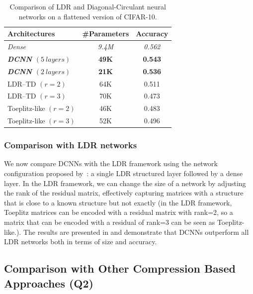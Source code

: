 \begin{table}[htb]
  \centering
  \begin{tabular}{lcc}
    \toprule
    \textbf{Architectures} & \textbf{\#Parameters} & \textbf{Accuracy}  \\
    \midrule
    \textit{Dense} & \textit{9.4M}	 & \textit{0.562} \\
    \textbf{\textit{DCNN $(5\ layers)$}} & \textbf{49K}	& \textbf{0.543} \\
    \textbf{\textit{DCNN $(2\ layers)$}} & \textbf{21K} & \textbf{0.536} \\
    LDR--TD	$(r = 2)$	         & 64K	& 0.511 \\
    LDR--TD	$(r = 3)$	         & 70K	& 0.473 \\
    Toeplitz-like $(r=2)$	         & 46K	& 0.483 \\
    Toeplitz-like $(r =3)$	         & 52K  & 0.496 \\
    \bottomrule
    \end{tabular}
    \caption{Comparison of LDR and Diagonal-Circulant neural networks on a flattened version of CIFAR-10.} 
    \label{table:ch4-xp_ldr}
\end{table}

\subsubsection{Comparison with LDR networks}


We now compare DCNNs with the LDR framework using the network configuration proposed by~\citet{thomas2018learning}: a single LDR structured layer followed by a dense layer.
In the LDR framework, we can change the size of a network by adjusting the rank of the residual matrix, effectively capturing matrices with a structure that is close to a known structure but not exactly (in the LDR framework, Toeplitz matrices can be encoded with a residual matrix with rank=2, so a matrix that can be encoded with a residual of rank=3 can be seen as Toeplitz-like.).
The results are presented in  and demonstrate that DCNNs outperform all LDR networks both in terms of size and accuracy.


\subsection{Comparison with Other Compression Based Approaches (Q2)}
\label{subsection:ch4-comparison_with_other_compression_based_approaches}


